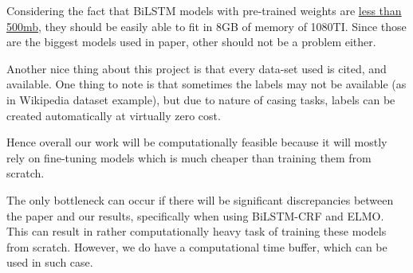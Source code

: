 \documentclass{article}
\begin{document}
Considering the fact that BiLSTM models with pre-trained weights are \href{https://github.com/UKPLab/emnlp2017-bilstm-cnn-crf/blob/master/docs/Pretrained_Models.md}{less than 500mb}, they should be easily able to fit in 8GB of memory of 1080TI. Since those are the biggest models used in paper, other should not be a problem either.

Another nice thing about this project is that every data-set used is cited, and available. One thing to note is that sometimes the labels may not be available (as in Wikipedia dataset example), but due to nature of casing tasks, labels can be created automatically at virtually zero cost.

Hence overall our work will be computationally feasible because it will mostly rely on fine-tuning models which is much cheaper than training them from scratch.

The only bottleneck can occur if there will be significant discrepancies between the paper and our results, specifically when using BiLSTM-CRF and ELMO. This can result in rather computationally heavy task of training these models from scratch. However, we do have a computational time buffer, which can be used in such case.
\end{document}
